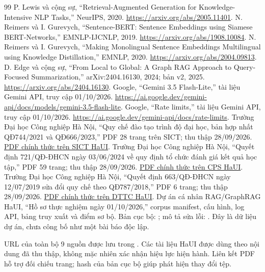 \begin{thebibliography}{99}
\small{}
 P. Lewis và cộng sự, ``Retrieval-Augmented Generation for Knowledge-Intensive NLP Tasks,'' NeurIPS, 2020. \url{https://arxiv.org/abs/2005.11401}.
 N. Reimers và I. Gurevych, ``Sentence-BERT: Sentence Embeddings using Siamese BERT-Networks,'' EMNLP-IJCNLP, 2019. \url{https://arxiv.org/abs/1908.10084}.
 N. Reimers và I. Gurevych, ``Making Monolingual Sentence Embeddings Multilingual using Knowledge Distillation,'' EMNLP, 2020. \url{https://arxiv.org/abs/2004.09813}.
 D. Edge và cộng sự, ``From Local to Global: A Graph RAG Approach to Query-Focused Summarization,'' arXiv:2404.16130, 2024; bản v2, 2025. \url{https://arxiv.org/abs/2404.16130}.
 Google, ``Gemini 3.5 Flash-Lite,'' tài liệu Gemini API, truy cập 01/10/2026. \url{https://ai.google.dev/gemini-api/docs/models/gemini-3.5-flash-lite}.
 Google, ``Rate limits,'' tài liệu Gemini API, truy cập 01/10/2026. \url{https://ai.google.dev/gemini-api/docs/rate-limits}.
 Trường Đại học Công nghiệp Hà Nội, ``Quy chế đào tạo trình độ đại học, bản hợp nhất QĐ744/2021 và QĐ666/2023,'' PDF 28 trang trên SICT; thu thập 28/09/2026. \href{https://sict.haui.edu.vn/media/29/uffile-upload-no-title29811.pdf}{PDF chính thức trên SICT HaUI}.
 Trường Đại học Công nghiệp Hà Nội, ``Quyết định 721/QĐ-ĐHCN ngày 03/06/2024 về quy định tổ chức đánh giá kết quả học tập,'' PDF 59 trang; thu thập 28/09/2026. \href{https://cps.haui.edu.vn/media/quyet-dinh-721-ngay-03-06-2024-ve-viec-ban-hanh-quy-dinh-to-chuc-dgkqht-cua-nguoi-hoc-truong-dhcn-hn\%20\%285\%29.pdf}{PDF chính thức trên CPS HaUI}.
 Trường Đại học Công nghiệp Hà Nội, ``Quyết định 663/QĐ-ĐHCN ngày 12/07/2019 sửa đổi quy chế theo QĐ787/2018,'' PDF 6 trang; thu thập 28/09/2026. \href{https://dttc.haui.edu.vn/media/2/uftai-ve-tai-day2712.pdf}{PDF chính thức trên DTTC HaUI}.
 Dự án cá nhân RAG/GraphRAG HaUI, ``Hồ sơ thực nghiệm ngày 01/10/2026,'' corpus manifest, cấu hình, log API, bảng truy xuất và điểm sơ bộ. Bản cục bộ: ; mô tả sửa lỗi: . Đây là dữ liệu dự án, chưa công bố như một bài báo độc lập.
\end{thebibliography}
\noindent\small URL của toàn bộ 9 nguồn được lưu trong . Các tài liệu HaUI được dùng theo nội dung đã thu thập, không mặc nhiên xác nhận hiệu lực hiện hành. Liên kết PDF hỗ trợ đối chiếu trang; hash của bản cục bộ giúp phát hiện thay đổi tệp.
